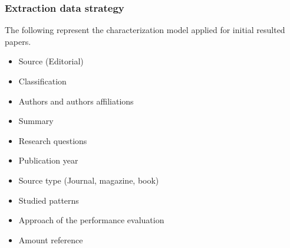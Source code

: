 \subsubsection {Extraction data strategy}
The following represent the characterization model applied for initial resulted papers.
\begin{itemize}
	\item Source (Editorial)
	\item Classification
	\item Authors and authors affiliations
	\item Summary
	\item Research questions
	\item Publication year
	\item Source type (Journal, magazine, book)
	\item Studied patterns
	\item Approach of the performance evaluation
	\item Amount reference 
\end{itemize}

